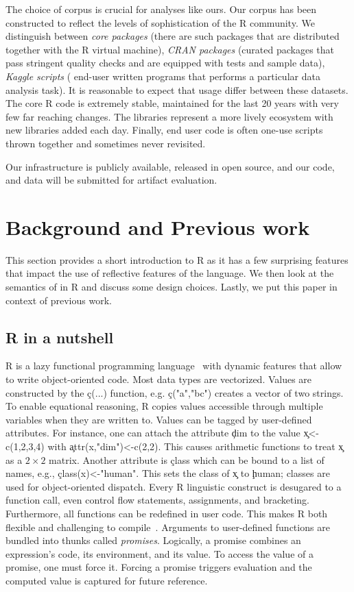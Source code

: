 \documentclass[USenglish,cleveref, autoref, thm-restate]{lipics-v2019}
\begin{document}
The choice of corpus is crucial for analyses like ours.  Our corpus
has been constructed to reflect the levels of sophistication of the R
community.  We distinguish between \emph{core packages} (there are
\CorpusCorePackages such packages that are distributed together with
the R virtual machine), \emph{CRAN packages} (\CorpusPackages curated
packages that pass stringent quality checks and are equipped with
tests and sample data), \emph{Kaggle scripts} (\CorpusFinishedKaggle
end-user written programs that performs a particular data analysis
task). It is reasonable to expect that \eval usage differ between
these datasets. The core R code is extremely stable, maintained for
the last 20 years with very few far reaching changes. The libraries
represent a more lively ecosystem with new libraries added each day.
Finally, end user code is often one-use scripts thrown together and
sometimes never revisited.

Our infrastructure is publicly available, released in open source, and
our code, and data will be submitted for artifact evaluation.

\section{Background and Previous work}

This section provides a short introduction to R as it has a few
surprising features that impact the use of reflective features of the
language. We then look at the semantics of \eval in R and discuss some
design choices. Lastly, we put this paper in context of previous work.

\subsection{R in a nutshell}

R is a lazy functional programming language~\cite{ecoop12} with
dynamic features that allow to write object-oriented code. Most data
types are vectorized. Values are constructed by the \c{c(...)}
function, e.g. \c{c("a","bc")} creates a vector of two strings. To
enable equational reasoning, R copies values accessible through
multiple variables when they are written to. Values can be tagged by
user-defined attributes. For instance, one can attach the attribute
\c{dim} to the value \c{x<-c(1,2,3,4)} with \c{attr(x,"dim")<-c(2,2)}.
This causes arithmetic functions to treat \c x as a $2 \times 2$
matrix. Another attribute is \c{class} which can be bound to a list of
names, e.g., \c{class(x)<-"human"}. This sets the class of \c{x} to
\c{human}; classes are used for object-oriented dispatch. Every R
linguistic construct is desugared to a function call, even control
flow statements, assignments, and bracketing. Furthermore, all
functions can be redefined in user code. This makes R both flexible
and challenging to compile~\cite{dls19}. Arguments to user-defined
functions are bundled into thunks called \emph{promises}. Logically, a
promise combines an expression's code, its environment, and its value.
To access the value of a promise, one must force it. Forcing a promise
triggers evaluation and the computed value is captured for future
reference.
\end{document}
